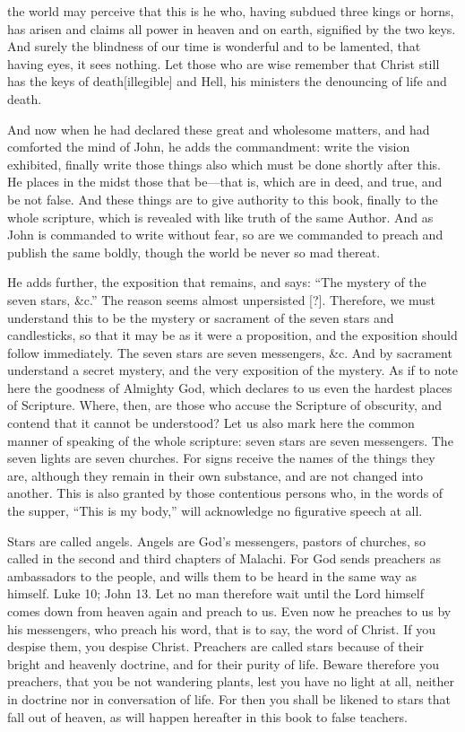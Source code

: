 the world may perceive that this is he who, having subdued three kings or horns, has arisen and claims all power in heaven and on earth, signified by the two keys. And surely the blindness of our time is wonderful and to be lamented, that having eyes, it sees nothing. Let those who are wise remember that Christ still has the keys of death[illegible] and Hell, his ministers the denouncing of life and death.

And now when he had declared these great and wholesome matters, and had comforted the mind of John, he adds the commandment: write the vision exhibited, finally write those things also which must be done shortly after this. He places in the midst those that be—that is, which are in deed, and true, and be not false. And these things are to give authority to this book, finally to the whole scripture, which is revealed with like truth of the same Author. And as John is commanded to write without fear, so are we commanded to preach and publish the same boldly, though the world be never so mad thereat.

He adds further, the exposition that remains, and says: “The mystery of the seven stars, \&c.” The reason seems almost unpersisted [?]. Therefore, we must understand this to be the mystery or sacrament of the seven stars and candlesticks, so that it may be as it were a proposition, and the exposition should follow immediately. The seven stars are seven messengers, \&c. And by sacrament understand a secret mystery, and the very exposition of the mystery. As if to note here the goodness of Almighty God, which declares to us even the hardest places of Scripture. Where, then, are those who accuse the Scripture of obscurity, and contend that it cannot be understood? Let us also mark here the common manner of speaking of the whole scripture: seven stars are seven messengers. The seven lights are seven churches. For signs receive the names of the things they are, although they remain in their own substance, and are not changed into another. This is also granted by those contentious persons who, in the words of the supper, “This is my body,” will acknowledge no figurative speech at all.

Stars are called angels. Angels are God’s messengers, pastors of churches, so called in the second and third chapters of Malachi. For God sends preachers as ambassadors to the people, and wills them to be heard in the same way as himself. Luke 10; John 13. Let no man therefore wait until the Lord himself comes down from heaven again and preach to us. Even now he preaches to us by his messengers, who preach his word, that is to say, the word of Christ. If you despise them, you despise Christ. Preachers are called stars because of their bright and heavenly doctrine, and for their purity of life. Beware therefore you preachers, that you be not wandering plants, lest you have no light at all, neither in doctrine nor in conversation of life. For then you shall be likened to stars that fall out of heaven, as will happen hereafter in this book to false teachers.

